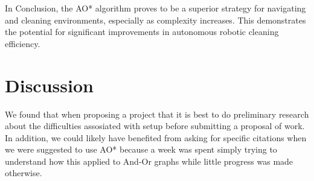 \documentclass{article}
\begin{document}
In Conclusion, the AO* algorithm proves to be a superior strategy for navigating and cleaning environments, especially as complexity increases. This demonstrates the potential for significant improvements in autonomous robotic cleaning efficiency.


\section{Discussion}
We found that when proposing a project that it is best to do preliminary research about the difficulties assosiated with setup before submitting a proposal of work. In addition, we could likely have benefited from asking for specific citations when we were suggested to use AO* because a week was spent simply trying to understand how this applied to And-Or graphs while little progress was made otherwise. 
\end{document}
